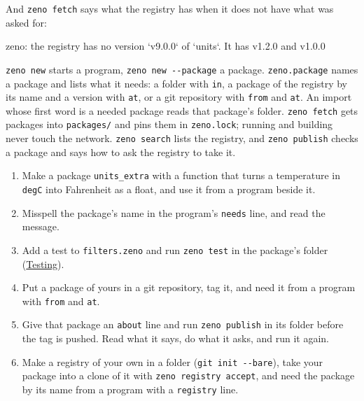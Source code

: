 And \verb|zeno fetch| says what the registry has when it does not have
what was asked for:

\begin{zenofrag}[lang=shell]
zeno: the registry has no version `v9.0.0` of `units`. It has v1.2.0 and v1.0.0
\end{zenofrag}

\begin{summary}
\verb|zeno new| starts a program, \verb|zeno new --package| a package.
\verb|zeno.package| names a package and lists what it needs: a folder
with \verb|in|, a package of the registry by its name and a version
with \verb|at|, or a git repository with \verb|from| and \verb|at|.
An import whose first word is a needed package reads that package's
folder. \verb|zeno fetch| gets packages into \verb|packages/| and
pins them in \verb|zeno.lock|; running and building never touch the
network. \verb|zeno search| lists the registry, and \verb|zeno publish|
checks a package and says how to ask the registry to take it.
\end{summary}

\begin{tryit}
\begin{enumerate}
\item Make a package \verb|units_extra| with a function that turns a
  temperature in \verb|degC| into Fahrenheit as a float, and use it
  from a program beside it.
\item Misspell the package's name in the program's \verb|needs| line,
  and read the message.
\item Add a test to \verb|filters.zeno| and run \verb|zeno test| in the
  package's folder (\hyperref[ch-testing]{Testing}).
\item Put a package of yours in a git repository, tag it, and need it
  from a program with \verb|from| and \verb|at|.
\item Give that package an \verb|about| line and run \verb|zeno publish|
  in its folder before the tag is pushed. Read what it says, do what it
  asks, and run it again.
\item Make a registry of your own in a folder (\verb|git init --bare|),
  take your package into a clone of it with
  \verb|zeno registry accept|, and need the package by its name from a
  program with a \verb|registry| line.
\end{enumerate}
\end{tryit}
